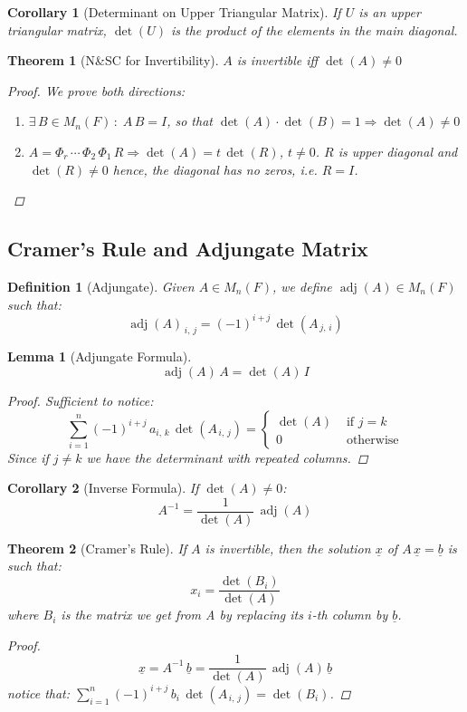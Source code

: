 \documentclass[12pt]{article}
\let\RA\Rightarrow
\let\LA\Leftarrow
\newcommand{\Exist}[1]{\exists\,{#1}\,:\;}
\newcommand{\tuple}[1]{\underline{#1}}
\DeclareMathOperator{\adj}{adj}
\newtheorem{theorem}{Theorem}[subsection]
\newtheorem{definition}{Definition}[subsection]
\newtheorem{lemma}{Lemma}[subsection]
\newtheorem{corollary}{Corollary}[subsection]
\begin{document}
\begin{corollary}[Determinant on Upper Triangular Matrix]
  If $U$ is an upper triangular matrix, $\det(U)$ is the product of the elements in the main diagonal.
\end{corollary}

\begin{theorem}[N\&SC for Invertibility]
  $A$ is invertible iff $\det(A)\neq 0$
  \begin{proof}
    We prove both directions:
    \begin{enumerate}
      \item[$(\RA)$] $\Exist{B\in M_n(F)} A\,B=I$, so that $\det(A)\cdot\det(B)=1\RA \det(A)\neq 0$
      \item[$(\LA)$] $A=\Phi_r\,\cdots\,\Phi_2\,\Phi_1\,R\RA \det(A)=t\,\det(R)$, $t\neq 0$. $R$ is upper diagonal and $\det(R)\neq 0$ hence, the diagonal has no zeros, i.e. $R=I$.
    \end{enumerate}
  \end{proof}
\end{theorem}

\subsection{Cramer's Rule and Adjungate Matrix}

\begin{definition}[Adjungate]
  Given $A\in M_n(F)$, we define $\adj(A)\in M_n(F)$ such that: $$\adj(A)_{\,i,\,j}=(-1)^{i+j}\,\det(A_{\,j,\,i})$$
\end{definition}

\begin{lemma}[Adjungate Formula]
  $$\adj(A)\, A=\det(A)\,I$$
  \begin{proof}
    Sufficient to notice:
    $$
    \sum_{i=1}^n(-1)^{i+j}\,a_{i,\,k}\,\det(A_{\,i,\,j})=
    \begin{cases}
      \det(A)&\text{ if }j=k\\
      0&\text{ otherwise}
    \end{cases}
    $$
    Since if $j\neq k$ we have the determinant with repeated columns.
  \end{proof}
\end{lemma}

\begin{corollary}[Inverse Formula]
  If $\det(A)\neq 0$: $$A^{-1}=\frac{1}{\det(A)}\,\adj(A)$$
\end{corollary}

\begin{theorem}[Cramer's Rule]
  If $A$ is invertible, then the solution $\tuple{x}$ of $A\,\tuple{x}=\tuple{b}$ is such that: $$x_i=\frac{\det(B_i)}{\det(A)}$$ where $B_i$ is the matrix we get from A by replacing its $i$-th column by $\tuple{b}$.
  \begin{proof}
    $$\tuple{x}=A^{-1}\,\tuple{b}=\frac{1}{\det(A)}\,\adj(A)\,\tuple{b}$$ notice that: $\sum_{i=1}^n(-1)^{i+j}\,b_i\,\det(A_{\,i,\,j})=\det(B_i)$.
  \end{proof}
\end{theorem}
\end{document}
